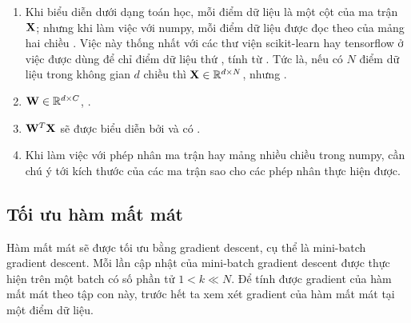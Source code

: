 \begin{mydeff}
\begin{enumerate}
\item Khi biểu diễn dưới dạng toán học, mỗi điểm dữ liệu là một cột của ma trận
$\mathbf{X}$; nhưng khi làm việc với numpy, mỗi điểm dữ liệu được đọc theo
 của mảng hai chiều .
Việc này
thống nhất với các thư viện scikit-learn hay tensorflow ở việc
 được dùng để chỉ điểm dữ liệu thứ , tính
từ . Tức là, nếu có $N$ điểm dữ liệu trong không gian $d$
chiều thì $\mathbf{X} \in \mathbb{R}^{d \times N}$, nhưng .

\item $\mathbf{W} \in \mathbb{R}^{d\times C}$, .

\item $\mathbf{W}^T\mathbf{X}$ sẽ được biểu diễn bởi  và có
.

\item Khi làm việc với phép nhân ma trận hay mảng nhiều chiều trong numpy,
cần chú ý tới kích thước của các ma trận sao cho các phép nhân thực
hiện được.

\end{enumerate}

\end{mydeff}


\subsection{Tối ưu hàm mất mát }


Hàm mất mát sẽ được tối ưu bằng gradient descent, cụ thể là mini-batch
gradient descent.
Mỗi lần cập nhật của mini-batch gradient descent được thực hiện trên một
{batch} có số phần tử $1 < k \ll N$. Để tính được gradient của hàm mất
mát theo tập con này, trước hết ta xem xét gradient của hàm mất mát tại một điểm
dữ liệu.

